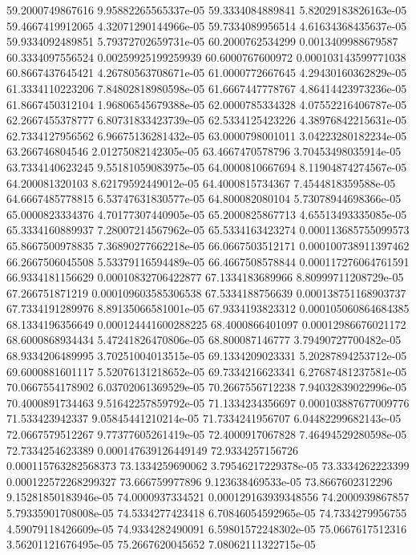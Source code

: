 {59.2000749867616 9.95882265565337e-05
59.3334084889841 5.82029183826163e-05
59.4667419912065 4.32071290144966e-05
59.7334089956514 4.61634368435637e-05
59.9334092489851 5.79372702659731e-05
60.2000762534299 0.0013409988679587
60.3334097556524 0.00259925199259939
60.6000767600972 0.000103143599771038
60.8667437645421 4.26780563708671e-05
61.0000772667645 4.29430160362829e-05
61.3334110223206 7.84802818980598e-05
61.6667447778767 4.86414423973236e-05
61.8667450312104 1.96806545679388e-05
62.0000785334328 4.07552216406787e-05
62.2667455378777 6.80731833423739e-05
62.5334125423226 4.38976842215631e-05
62.7334127956562 6.96675136281432e-05
63.0000798001011 3.04223280182234e-05
63.266746804546 2.01275082142305e-05
63.4667470578796 3.70453498035914e-05
63.7334140623245 9.55181059083975e-05
64.0000810667694 8.11904874274567e-05
64.200081320103 8.62179592449012e-05
64.4000815734367 7.4544818359588e-05
64.6667485778815 6.53747631830577e-05
64.800082080104 5.73078944698366e-05
65.0000823334376 4.70177307440905e-05
65.2000825867713 4.65513493335085e-05
65.3334160889937 7.28007214567962e-05
65.5334163423274 0.000113685755099573
65.8667500978835 7.36890277662218e-05
66.0667503512171 0.000100738911397462
66.2667506045508 5.53379116594489e-05
66.4667508578844 0.000117276064761591
66.9334181156629 0.00010832706422877
67.1334183689966 8.80999711208729e-05
67.266751871219 0.000109603585306538
67.5334188756639 0.000138751168903737
67.7334191289976 8.89135066581001e-05
67.9334193823312 0.000105060864684385
68.1334196356649 0.000124441600288225
68.4000866401097 0.00012986676021172
68.6000868934434 5.47241826470806e-05
68.800087146777 3.79490727700482e-05
68.9334206489995 3.70251004013515e-05
69.1334209023331 5.20287894253712e-05
69.6000881601117 5.52076131218652e-05
69.7334216623341 6.27687481237581e-05
70.0667554178902 6.03702061369529e-05
70.2667556712238 7.94032839022996e-05
70.4000891734463 9.51642257859792e-05
71.1334234356697 0.000103887677009776
71.533423942337 9.05845441210214e-05
71.7334241956707 6.04482299682143e-05
72.0667579512267 9.77377605261419e-05
72.4000917067828 7.46494529280598e-05
72.7334254623389 0.000147639126449149
72.9334257156726 0.000115763282568373
73.1334259690062 3.79546217229378e-05
73.3334262223399 0.000122572268299327
73.666759977896 9.123638469533e-05
73.8667602312296 9.15281850183946e-05
74.0000937334521 0.000129163939348556
74.2000939867857 5.79335901708008e-05
74.5334277423418 6.70846054592965e-05
74.7334279956755 4.59079118426609e-05
74.9334282490091 6.59801572248302e-05
75.0667617512316 3.56201121676495e-05
75.2667620045652 7.08062111322715e-05
}
